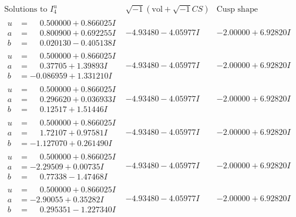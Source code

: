 \documentclass[1p]{elsarticle_modified}
\theoremstyle{definition}
\newcommand{\I}{\sqrt{-1}}
\begin{document}
$$\begin{array}{c|c|c}  
\text{Solutions to }I^u_{4}& \I (\text{vol} + \sqrt{-1}CS) & \text{Cusp shape}\\
 \hline 
\begin{aligned}
u &= \phantom{-}0.500000 + 0.866025 I \\
a &= \phantom{-}0.800900 + 0.692255 I \\
b &= \phantom{-}0.020130 - 0.405138 I\end{aligned}
 & -4.93480 - 4.05977 I & -2.00000 + 6.92820 I \\ \hline\begin{aligned}
u &= \phantom{-}0.500000 + 0.866025 I \\
a &= \phantom{-}0.37705 + 1.39893 I \\
b &= -0.086959 + 1.331210 I\end{aligned}
 & -4.93480 - 4.05977 I & -2.00000 + 6.92820 I \\ \hline\begin{aligned}
u &= \phantom{-}0.500000 + 0.866025 I \\
a &= \phantom{-}0.296620 + 0.036933 I \\
b &= \phantom{-}0.12517 + 1.51446 I\end{aligned}
 & -4.93480 - 4.05977 I & -2.00000 + 6.92820 I \\ \hline\begin{aligned}
u &= \phantom{-}0.500000 + 0.866025 I \\
a &= \phantom{-}1.72107 + 0.97581 I \\
b &= -1.127070 + 0.261490 I\end{aligned}
 & -4.93480 - 4.05977 I & -2.00000 + 6.92820 I \\ \hline\begin{aligned}
u &= \phantom{-}0.500000 + 0.866025 I \\
a &= -2.29509 + 0.00735 I \\
b &= \phantom{-}0.77338 - 1.47468 I\end{aligned}
 & -4.93480 - 4.05977 I & -2.00000 + 6.92820 I \\ \hline\begin{aligned}
u &= \phantom{-}0.500000 + 0.866025 I \\
a &= -2.90055 + 0.35282 I \\
b &= \phantom{-}0.295351 - 1.227340 I\end{aligned}
 & -4.93480 - 4.05977 I & -2.00000 + 6.92820 I \\ \hline\begin{aligned}

\end{aligned}
\end{array}$$
\end{document}
